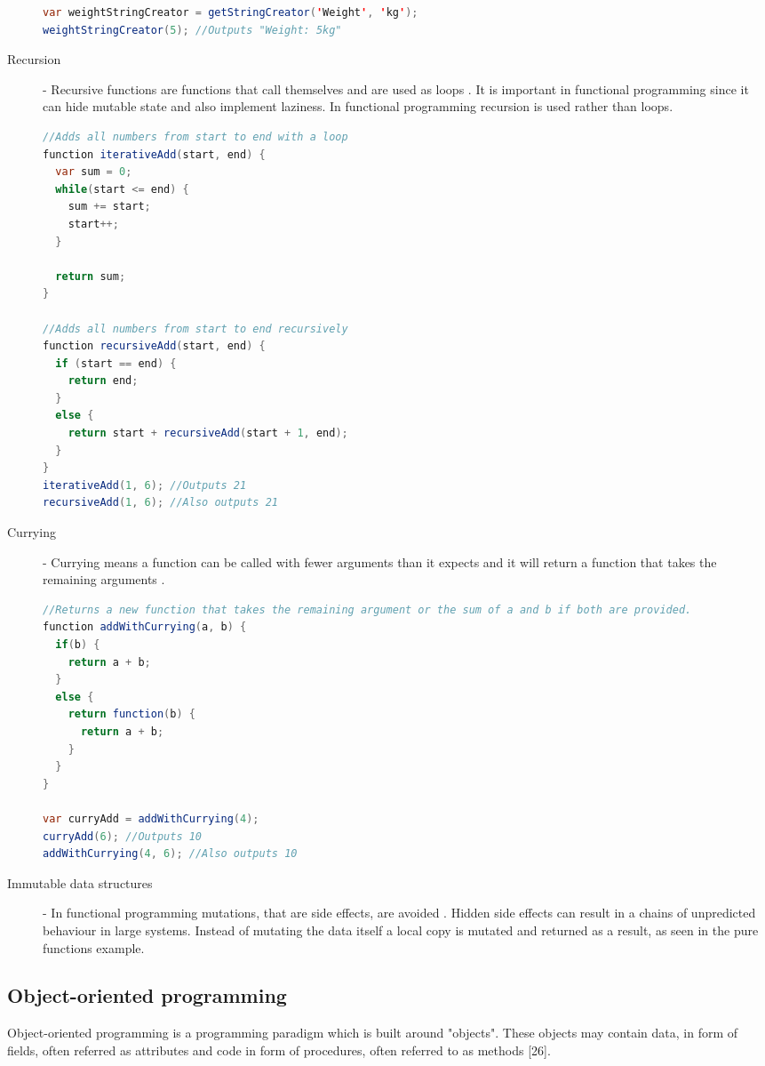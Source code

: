 \documentclass {article}
\begin{document}
\begin{description}
\begin{lstlisting}[language=Java, breaklines=true]
var weightStringCreator = getStringCreator('Weight', 'kg');
weightStringCreator(5); //Outputs "Weight: 5kg"
\end{lstlisting}

\item [Recursion] - Recursive functions are functions that call themselves and are used as loops \cite{fogus}. It is important in functional programming since it can hide mutable state and also implement laziness. In functional programming recursion is used rather than loops.

\begin{lstlisting}[language=Java]
//Adds all numbers from start to end with a loop
function iterativeAdd(start, end) {
  var sum = 0;
  while(start <= end) {
    sum += start;
    start++;
  }

  return sum;
}

//Adds all numbers from start to end recursively
function recursiveAdd(start, end) {
  if (start == end) {
    return end;
  }
  else {
    return start + recursiveAdd(start + 1, end);
  }
}
iterativeAdd(1, 6); //Outputs 21
recursiveAdd(1, 6); //Also outputs 21
\end{lstlisting}

\item [Currying] - Currying means a function can be called with fewer arguments than it expects and it will return a function that takes the remaining arguments \cite{drboolean}. 

\begin{lstlisting}[language=Java, breaklines=true]
//Returns a new function that takes the remaining argument or the sum of a and b if both are provided.
function addWithCurrying(a, b) {
  if(b) {
    return a + b;
  }
  else {
    return function(b) {
      return a + b;
    }
  }
}

var curryAdd = addWithCurrying(4); 
curryAdd(6); //Outputs 10
addWithCurrying(4, 6); //Also outputs 10
\end{lstlisting}

\item [Immutable data structures] - In functional programming mutations, that are side effects, are avoided \cite{fogus}. Hidden side effects can result in a chains of unpredicted behaviour in large systems. Instead of mutating the data itself a local copy is mutated and returned as a result, as seen in the pure functions example.
\end{description}
\subsection{Object-oriented programming}
Object-oriented programming is a programming paradigm which is built around "objects". These objects may contain data, in form of fields, often referred as attributes and code in form of procedures, often referred to as methods [26].
\end{document}
